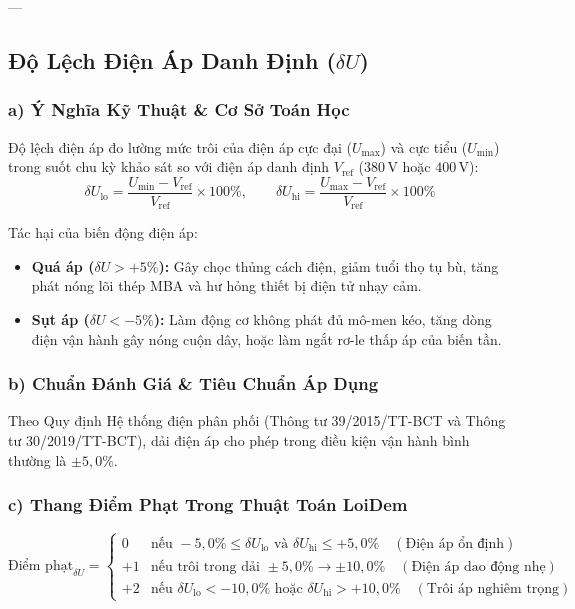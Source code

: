 \documentclass[12pt,a4paper]{article}
\begin{document}
---

\subsection{\texorpdfstring{Độ Lệch Điện Áp Danh Định ($\delta U$)}{Độ Lệch Điện Áp Danh Định (delta U)}}

\subsubsection{a) Ý Nghĩa Kỹ Thuật \& Cơ Sở Toán Học}
Độ lệch điện áp đo lường mức trôi của điện áp cực đại ($U_{\max}$) và cực tiểu ($U_{\min}$) trong suốt chu kỳ khảo sát so với điện áp danh định $V_{\mathrm{ref}}$ ($380\,\mathrm{V}$ hoặc $400\,\mathrm{V}$):
\begin{equation}
  \delta U_{\mathrm{lo}} = \frac{U_{\min} - V_{\mathrm{ref}}}{V_{\mathrm{ref}}} \times 100\%, \qquad
  \delta U_{\mathrm{hi}} = \frac{U_{\max} - V_{\mathrm{ref}}}{V_{\mathrm{ref}}} \times 100\%
\end{equation}

Tác hại của biến động điện áp:
\begin{itemize}
  \item \textbf{Quá áp ($\delta U > +5\%$):} Gây chọc thủng cách điện, giảm tuổi thọ tụ bù, tăng phát nóng lõi thép MBA và hư hỏng thiết bị điện tử nhạy cảm.
  \item \textbf{Sụt áp ($\delta U < -5\%$):} Làm động cơ không phát đủ mô-men kéo, tăng dòng điện vận hành gây nóng cuộn dây, hoặc làm ngắt rơ-le thấp áp của biến tần.
\end{itemize}

\subsubsection{b) Chuẩn Đánh Giá \& Tiêu Chuẩn Áp Dụng}
Theo Quy định Hệ thống điện phân phối (Thông tư 39/2015/TT-BCT và Thông tư 30/2019/TT-BCT), dải điện áp cho phép trong điều kiện vận hành bình thường là $\pm 5{,}0\%$.

\subsubsection{c) Thang Điểm Phạt Trong Thuật Toán LoiDem}
\begin{equation}
  \text{Điểm phạt}_{\delta U} = 
  \begin{cases} 
    0 & \text{nếu } -5{,}0\% \le \delta U_{\mathrm{lo}} \text{ và } \delta U_{\mathrm{hi}} \le +5{,}0\% \quad (\text{Điện áp ổn định}) \\
    +1 & \text{nếu trôi trong dải } \pm 5{,}0\% \to \pm 10{,}0\% \quad (\text{Điện áp dao động nhẹ}) \\
    +2 & \text{nếu } \delta U_{\mathrm{lo}} < -10{,}0\% \text{ hoặc } \delta U_{\mathrm{hi}} > +10{,}0\% \quad (\text{Trôi áp nghiêm trọng})
  \end{cases}
\end{equation}
\end{document}
